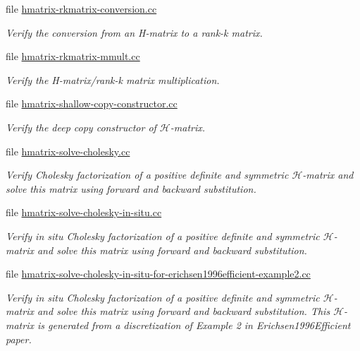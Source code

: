 \begin{DoxyCompactItemize}
file \hyperlink{hmatrix-rkmatrix-conversion_8cc}{hmatrix-\/rkmatrix-\/conversion.\+cc}
\begin{DoxyCompactList}\small\item\em Verify the conversion from an H-\/matrix to a rank-\/k matrix. \end{DoxyCompactList}\item 
file \hyperlink{hmatrix-rkmatrix-mmult_8cc}{hmatrix-\/rkmatrix-\/mmult.\+cc}
\begin{DoxyCompactList}\small\item\em Verify the H-\/matrix/rank-\/k matrix multiplication. \end{DoxyCompactList}\item 
file \hyperlink{hmatrix-shallow-copy-constructor_8cc}{hmatrix-\/shallow-\/copy-\/constructor.\+cc}
\begin{DoxyCompactList}\small\item\em Verify the deep copy constructor of $\mathcal{H}$-\/matrix. \end{DoxyCompactList}\item 
file \hyperlink{hmatrix-solve-cholesky_8cc}{hmatrix-\/solve-\/cholesky.\+cc}
\begin{DoxyCompactList}\small\item\em Verify Cholesky factorization of a positive definite and symmetric $\mathcal{H}$-\/matrix and solve this matrix using forward and backward substitution. \end{DoxyCompactList}\item 
file \hyperlink{hmatrix-solve-cholesky-in-situ_8cc}{hmatrix-\/solve-\/cholesky-\/in-\/situ.\+cc}
\begin{DoxyCompactList}\small\item\em Verify in situ Cholesky factorization of a positive definite and symmetric $\mathcal{H}$-\/matrix and solve this matrix using forward and backward substitution. \end{DoxyCompactList}\item 
file \hyperlink{hmatrix-solve-cholesky-in-situ-for-erichsen1996efficient-example2_8cc}{hmatrix-\/solve-\/cholesky-\/in-\/situ-\/for-\/erichsen1996efficient-\/example2.\+cc}
\begin{DoxyCompactList}\small\item\em Verify in situ Cholesky factorization of a positive definite and symmetric $\mathcal{H}$-\/matrix and solve this matrix using forward and backward substitution. This $\mathcal{H}$-\/matrix is generated from a discretization of Example 2 in Erichsen1996\+Efficient paper. \end{DoxyCompactList}\item 

\end{DoxyCompactItemize}
